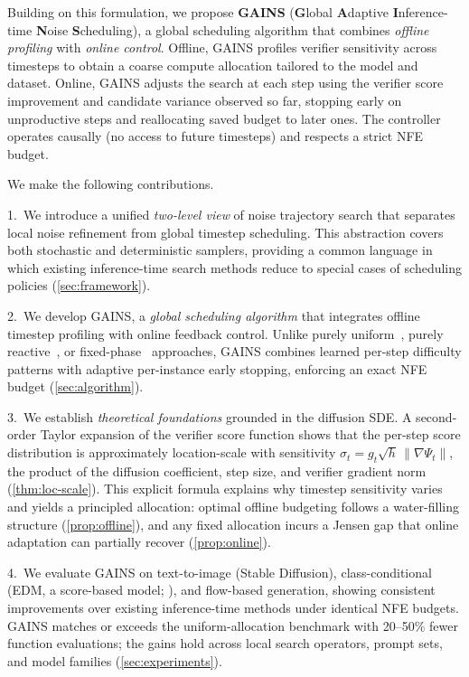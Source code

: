 Building on this formulation, we propose \textbf{GAINS} (\textbf{G}lobal
\textbf{A}daptive \textbf{I}nference-time \textbf{N}oise \textbf{S}cheduling),
a global scheduling algorithm that combines \emph{offline profiling} with
\emph{online control}.
Offline, GAINS profiles verifier sensitivity across timesteps to obtain a coarse
compute allocation tailored to the model and dataset.
Online, GAINS adjusts the search at each step using the verifier score
improvement and candidate variance observed so far, stopping
early on unproductive steps and reallocating saved budget to later ones.
The controller operates causally (no access to future timesteps) and respects a
strict NFE budget.

We make the following contributions.

1.~We introduce a unified \emph{two-level view} of noise trajectory search that
separates local noise refinement from global timestep scheduling.
This abstraction covers both stochastic and deterministic
samplers, providing a common language in which existing inference-time search
methods reduce to special cases of scheduling policies (\cref{sec:framework}).

2.~We develop GAINS, a \emph{global scheduling algorithm} that integrates
offline timestep profiling with online feedback control.
Unlike purely uniform~\citep{ramesh2025nts}, purely
reactive~\citep{kim2025rbf}, or fixed-phase~\citep{zhang2025tscend}
approaches, GAINS combines learned per-step difficulty patterns with adaptive
per-instance early stopping, enforcing an exact NFE budget
(\cref{sec:algorithm}).

3.~We establish \emph{theoretical foundations} grounded in the diffusion SDE.
A second-order Taylor expansion of the verifier score function shows that
the per-step score distribution is approximately location-scale with
sensitivity $\sigma_t = g_t\sqrt{h}\,\|\nabla\Psi_t\|$, the product of the
diffusion coefficient, step size, and verifier gradient norm
(\cref{thm:loc-scale}).
This explicit formula explains why timestep sensitivity varies and yields a
principled allocation: optimal offline budgeting follows a water-filling
structure (\cref{prop:offline}), and any fixed allocation incurs a Jensen gap
that online adaptation can partially recover (\cref{prop:online}).

4.~We evaluate GAINS on text-to-image (Stable Diffusion),
class-conditional (EDM, a score-based model; \citealt{karras2022elucidating}), and flow-based generation,
showing consistent improvements over existing inference-time methods under
identical NFE budgets.
GAINS matches or exceeds the uniform-allocation benchmark with 20--50\% fewer function
evaluations; the gains hold across local search operators, prompt sets, and
model families (\cref{sec:experiments}).

